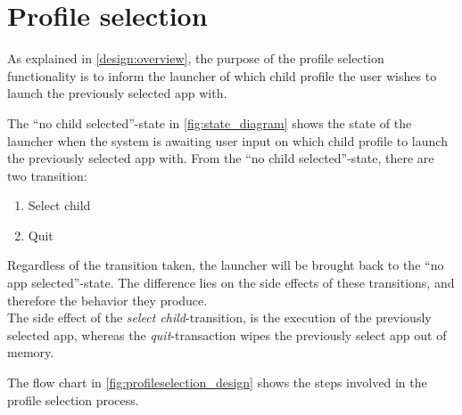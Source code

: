 \section{Profile selection}
\label{design:profile_selection}

As explained in \autoref{design:overview}, the purpose of the profile selection functionality is to inform the launcher of which child profile the user wishes to launch the previously selected app with.

The ``no child selected''-state in \autoref{fig:state_diagram} shows the state of the launcher when the system is awaiting user input on which child profile to launch the previously selected app with.
From the ``no child selected''-state, there are two transition:

\begin{enumerate}
	\item Select child
	\item Quit
\end{enumerate}

\noindent Regardless of the transition taken, the launcher will be brought  back to the ``no app selected''-state.
The difference lies on the side effects of these transitions, and therefore the behavior they produce. \\

\noindent The side effect of the \emph{select child}-transition, is the execution of the previously selected app, whereas the \emph{quit}-transaction wipes the previously select app out of memory.

The flow chart in \autoref{fig:profileselection_design} shows the steps involved in the profile selection process.

